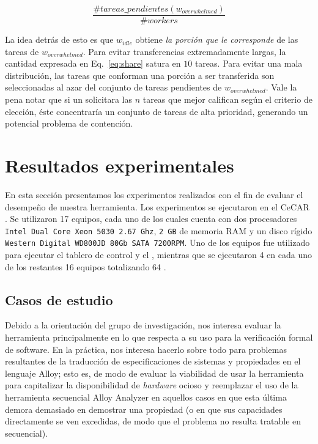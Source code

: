 \begin{equation}
\frac{\#tareas\_pendientes(w_{overwhelmed})}{\# workers}
\label{eq:share}
\end{equation} 

La idea detrás de esto es que $w_{idle}$
obtiene \emph{la porción que le corresponde} de las tareas de
$w_{overwhelmed}$. Para evitar transferencias extremadamente largas, la
cantidad expresada en Eq.~\ref{eq:share} satura en $10$ tareas. Para evitar
una mala distribución, las tareas que conforman una porción a ser transferida
son seleccionadas al azar del conjunto de tareas pendientes de
$w_{overwhelmed}$. Vale la pena notar que si un \w solicitara las $n$ tareas que mejor califican según el criterio de elección, éste concentraría un conjunto de tareas de alta prioridad, generando un potencial problema de contención.

\section{Resultados experimentales}

En esta sección presentamos los experimentos realizados con el fin de evaluar
el desempeño de nuestra herramienta.  Los experimentos se ejecutaron en el
\cluster CeCAR \cite{cecar}. Se utilizaron 17 equipos,
cada uno de los cuales cuenta con dos procesadores \texttt{Intel Dual Core Xeon
5030 2.67 Ghz}, \texttt{2 GB} de memoria RAM y un disco rígido \texttt{Western
Digital WD800JD 80Gb SATA 7200RPM}. Uno de los equipos fue utilizado para
ejecutar el tablero de control y el \master, mientras que se ejecutaron 4 \ws
en cada uno de los restantes 16 equipos totalizando 64 \ws.


\subsection{Casos de estudio}

Debido a la orientación del grupo de investigación, nos interesa evaluar la herramienta principalmente en lo que respecta a su uso para la verificación formal de software. En la práctica, nos interesa hacerlo sobre todo para problemas resultantes de la traducción de especificaciones de sistemas y propiedades en el lenguaje Alloy; esto es, de modo de evaluar la viabilidad de usar la herramienta para capitalizar la disponibilidad de \emph{hardware} ocioso y reemplazar el uso de la herramienta secuencial Alloy Analyzer en aquellos casos en que esta última demora demasiado en demostrar una propiedad (o en que sus capacidades directamente se ven excedidas, de modo que el problema no resulta tratable en secuencial).

